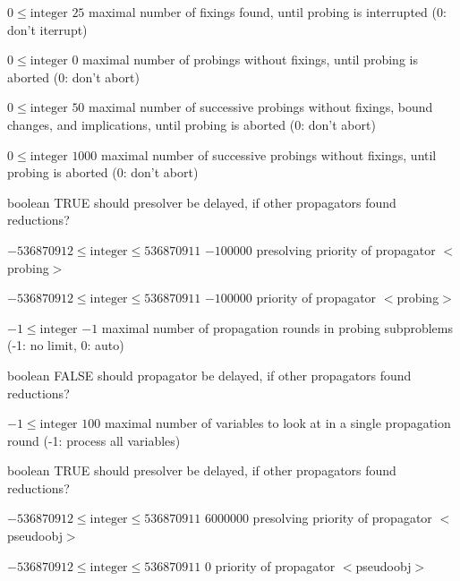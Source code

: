 %
{$0\leq\textrm{integer}$}%
{$25$}%
{maximal number of fixings found, until probing is interrupted (0: don't iterrupt)}%
{}

%
{$0\leq\textrm{integer}$}%
{$0$}%
{maximal number of probings without fixings, until probing is aborted (0: don't abort)}%
{}

%
{$0\leq\textrm{integer}$}%
{$50$}%
{maximal number of successive probings without fixings, bound changes, and implications, until probing is aborted (0: don't abort)}%
{}

%
{$0\leq\textrm{integer}$}%
{$1000$}%
{maximal number of successive probings without fixings, until probing is aborted (0: don't abort)}%
{}

%
{boolean}%
{TRUE}%
{should presolver be delayed, if other propagators found reductions?}%
{}

%
{$-536870912\leq\textrm{integer}\leq536870911$}%
{$-100000$}%
{presolving priority of propagator $<$probing$>$}%
{}

%
{$-536870912\leq\textrm{integer}\leq536870911$}%
{$-100000$}%
{priority of propagator $<$probing$>$}%
{}

%
{$-1\leq\textrm{integer}$}%
{$-1$}%
{maximal number of propagation rounds in probing subproblems (-1: no limit, 0: auto)}%
{}

%
{boolean}%
{FALSE}%
{should propagator be delayed, if other propagators found reductions?}%
{}

%
{$-1\leq\textrm{integer}$}%
{$100$}%
{maximal number of variables to look at in a single propagation round (-1: process all variables)}%
{}

%
{boolean}%
{TRUE}%
{should presolver be delayed, if other propagators found reductions?}%
{}

%
{$-536870912\leq\textrm{integer}\leq536870911$}%
{$6000000$}%
{presolving priority of propagator $<$pseudoobj$>$}%
{}

%
{$-536870912\leq\textrm{integer}\leq536870911$}%
{$0$}%
{priority of propagator $<$pseudoobj$>$}%
{}

